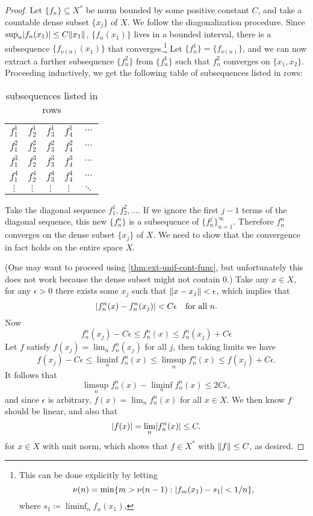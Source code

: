\begin{proof}
    Let $\{f_n\} \subseteq X^*$ be norm bounded by some positive constant $C$, and take a countable dense subset $\{x_j\}$ of $X$. We follow the diagonalization procedure. Since $\sup_n \lvert f_n(x_1) \rvert \leq C \lVert x_1 \rVert$, $\{f_n(x_1)\}$ lives in a bounded interval, there is a subsequence $\{f_{\nu(n)} (x_1)\}$ that converges.\footnote{This can be done explicitly by letting \[
        \nu(n) = \min\{m > \nu(n-1) : \lvert f_m(x_1) - s_1 \rvert < 1/n\},
    \] where $s_1 \coloneqq \liminf_n f_n(x_1)$.} Let $\{f_n^1\} = \{f_{\nu(n)}\}$, and we can now extract a further subsequence $\{f_n^2\}$ from $\{f_n^1\}$ such that $f_n^2$ converges on $\{x_1,x_2\}$. Proceeding inductively, we get the following table of subsequences listed in rows: 
    \begin{table}[ht]
    \renewcommand{\arraystretch}{1.2}
        \centering
        \caption{subsequences listed in rows}
        \begin{tabular}{ccccc}
            $f_1^1$ & $f_2^1$ & $f_3^1$ & $f_4^1$ & $\cdots$ \\
            $f_1^2$ & $f_2^2$ & $f_3^2$ & $f_4^2$ & $\cdots$ \\
            $f_1^3$ & $f_2^3$ & $f_3^3$ & $f_4^3$ & $\cdots$ \\
            $f_1^4$ & $f_2^4$ & $f_3^4$ & $f_4^4$ & $\cdots$ \\
            $\vdots$ & $\vdots$ & $\vdots$ & $\vdots$ & $\ddots$
        \end{tabular}
        \renewcommand{\arraystretch}{1}
    \end{table}
    
     Take the diagonal sequence $f_1^1, f_2^2,\dotsc$. If we ignore the first $j-1$ terms of the diagonal sequence, this new $\{f_n^n\}$ is a subsequence of $\{f_n^j\}_{n=1}^\infty$. Therefore $f_{n}^n$ converges on the dense subset $\{x_j\}$ of $X$. We need to show that the convergence in fact holds on the entire space $X$.
     
     (One may want to proceed using \cref{thm:ext-unif-cont-func}, but unfortunately this does not work because the dense subset might not contain $0$.)
     Take any $x \in X$, for any $\epsilon>0$ there exists some $x_j$ such that $\lVert x - x_j \rVert < \epsilon$, which implies that \[
        \lvert f_n^n(x) - f_n^n(x_j) \rvert < C\epsilon \quad \text{for all }n.
     \] Now \[
        f_n^n(x_j) - C\epsilon \leq f_n^n(x) \leq f_n^n(x_j) + C\epsilon
     \] Let $f$ satisfy $f(x_j) = \lim_n f_n^n(x_j)$ for all $j$, then taking limits we have \[
        f(x_j) - C\epsilon \leq \liminf_n f_n^n(x) \leq \limsup_n f_n^n (x) \leq f(x_j) + C\epsilon.
     \] It follows that \[
        \limsup_n f_n^n(x) - \liminf_n f_n^n(x) \leq 2C\epsilon,
     \] and since $\epsilon$ is arbitrary, $f(x) = \lim_n f_n^n(x)$ for all $x \in X$. 
     We then know $f$ should be linear, and also that \[
        \lvert f(x) \rvert = \lim_n \lvert f_n^n(x) \rvert \leq C.
     \] for $x \in X$ with unit norm, which shows that $f\in X^*$ with $\lVert f \rVert \leq C$, as desired.
\end{proof}

